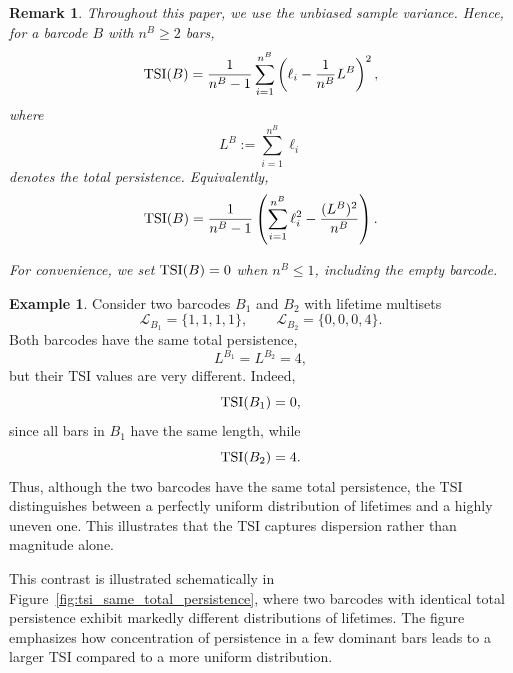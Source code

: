 \documentclass[11pt]{amsart}
\newtheorem*{remark}{Remark}
\newtheorem{prop}{Proposition}[section]
\theoremstyle{definition}
\newtheorem{example}{Example}[section]
\newcommand{\tsi}[0]{\textup{TSI}}
\begin{document}
\begin{remark}\rm 
Throughout this paper, we use the unbiased sample variance. Hence, for a barcode $B$ with $n^B\geq 2$ bars,
\begin{equation}
    \tsi(B)=\frac{1}{n^B-1}\sum_{i=1}^{n^B}\left(\ell_i-\frac{1}{n^B}L^B\right)^2,
\end{equation}
where
\[
L^B:=\sum_{i=1}^{n^B}\ell_i
\]
denotes the total persistence. Equivalently,
\begin{equation}
    \tsi(B)=\frac{1}{n^B-1}\left(\sum_{i=1}^{n^B}\ell_i^2-\frac{(L^B)^2}{n^B}\right).
\end{equation}

For convenience, we set $\tsi(B)=0$ when $n^B\leq 1$, including the empty barcode.
\end{remark}





\begin{example}
Consider two barcodes $B_1$ and $B_2$ with lifetime multisets
\[
\mathcal{L}_{B_1}=\{1,1,1,1\},
\qquad
\mathcal{L}_{B_2}=\{0,0,0,4\}.
\]
Both barcodes have the same total persistence,
\[
L^{B_1}=L^{B_2}=4,
\]
but their TSI values are very different. Indeed,
\[
\tsi(B_1)=0,
\]
since all bars in $B_1$ have the same length, while
\[
\tsi(B_2)=4.
\]
Thus, although the two barcodes have the same total persistence, the TSI distinguishes between a perfectly uniform distribution of lifetimes and a highly uneven one. This illustrates that the TSI captures dispersion rather than magnitude alone.
\end{example}

This contrast is illustrated schematically in Figure~\ref{fig:tsi_same_total_persistence}, where two barcodes with identical total persistence exhibit markedly different distributions of lifetimes. The figure emphasizes how concentration of persistence in a few dominant bars leads to a larger TSI compared to a more uniform distribution.
\end{document}

